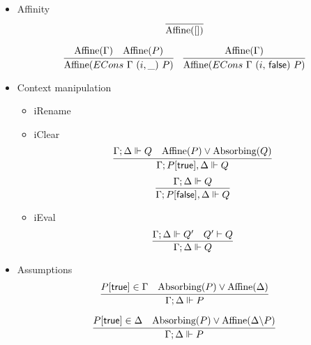 \begin{itemize}

\item Affinity
  $$
  \infer{\Affine{[]}}{}
  $$

  \begin{equation*}
  \infer{\Affine{ECons\ \Gamma\ (i,\_)\ P}}
        {\Affine{\Gamma} &
         \Affine{P}
       }
  \quad
  \infer{\Affine{ECons\ \Gamma\ (i,\, \false)\ P}}
        {\Affine{\Gamma}}
  \end{equation*}
\item Context manipulation
  \begin{itemize}
  \item iRename
  \item iClear
    $$
    \infer{\Gamma ; P[\true], \Delta \Vdash Q}
          {\Gamma ; \Delta \Vdash Q &
           \Affine{P} \vee \Absorbing{Q}}
    $$
    $$
    \infer{\Gamma ; P[\false], \Delta \Vdash Q}
          {\Gamma ; \Delta \Vdash Q}
    $$
  \item iEval
    $$
    \infer{\Gamma ; \Delta \Vdash Q}
          {\Gamma ; \Delta \Vdash Q' &
           Q' \vdash Q
          }
    $$
  \end{itemize}
\item Assumptions
  $$
  \infer{\Gamma; \Delta \Vdash P}
        {P[\true] \in \Gamma &
         \Absorbing{P} \vee \Affine{\Delta}}
  $$

 $$
  \infer{\Gamma; \Delta \Vdash P}
        {P[\true] \in \Delta &
         \Absorbing{P} \vee \Affine{\Delta \backslash P}}
 $$


\end{itemize}
